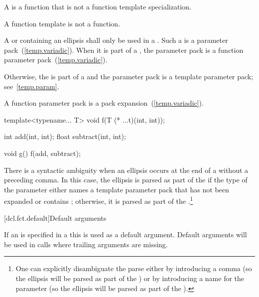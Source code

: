 \pnum
A  is a function that is not a function template
specialization. \begin{note} A function template is not a function. \end{note}

\pnum
A  or 
containing an ellipsis shall only
be used in a . Such a
 is a parameter
pack~(\ref{temp.variadic}). When it is part of a
, the parameter pack is a
function parameter pack~(\ref{temp.variadic}). \begin{note}
Otherwise, the  is part of a
 and the parameter pack is a
template parameter pack; see~\ref{temp.param}. \end{note}
A function parameter pack is a pack expansion~(\ref{temp.variadic}).
\begin{example}

\begin{codeblock}
template<typename... T> void f(T (* ...t)(int, int));

int add(int, int);
float subtract(int, int);

void g() {
  f(add, subtract);
}
\end{codeblock}
\end{example}

\pnum
There is a syntactic ambiguity when an ellipsis occurs at the end
of a  without a preceding
comma. In this case, the ellipsis is parsed as part of the
 if the type of the parameter either names
a template parameter pack that has not been expanded or contains ;
otherwise, it is
parsed as part of the .\footnote{One can explicitly disambiguate the parse either by
introducing a comma (so the ellipsis will be parsed as part of the
) or by introducing a name for the
parameter (so the ellipsis will be parsed as part of the
).}%

[dcl.fct.default]{Default arguments}%

\pnum
If an  is specified in a
 this
is used as a default argument.
Default arguments will be used in calls where trailing arguments are missing.

